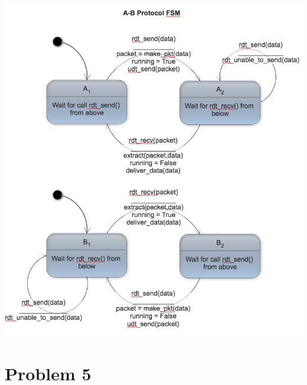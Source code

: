 \documentclass[letter,10pt]{article}
\begin{document}
\begin{center}
\noindent\includegraphics[height=.9\textheight,width=.9\textwidth]{./figures/abfsm}
\end{center}

\section{Problem 5}
\end{document}

